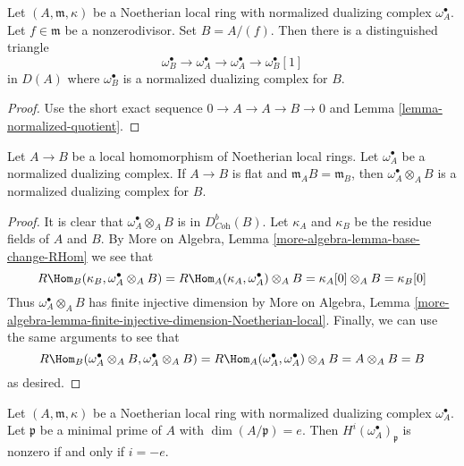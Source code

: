 \begin{lemma}
\label{lemma-divide-by-nonzerodivisor}
Let $(A, \mathfrak m, \kappa)$ be a Noetherian local
ring with normalized dualizing complex $\omega_A^\bullet$.
Let $f \in \mathfrak m$ be a
nonzerodivisor. Set $B = A/(f)$. Then there is a distinguished
triangle
$$
\omega_B^\bullet \to \omega_A^\bullet \to \omega_A^\bullet \to
\omega_B^\bullet[1]
$$
in $D(A)$ where $\omega_B^\bullet$ is a normalized dualizing complex
for $B$.
\end{lemma}

\begin{proof}
Use the short exact sequence $0 \to A \to A \to B \to 0$
and Lemma \ref{lemma-normalized-quotient}.
\end{proof}

\begin{lemma}
\label{lemma-flat-unramified}
Let $A \to B$ be a local homomorphism of Noetherian local rings.
Let $\omega_A^\bullet$ be a normalized dualizing complex.
If $A \to B$ is flat and $\mathfrak m_A B = \mathfrak m_B$,
then $\omega_A^\bullet \otimes_A B$ is a normalized dualizing
complex for $B$.
\end{lemma}

\begin{proof}
It is clear that $\omega_A^\bullet \otimes_A B$ is in $D^b_{\textit{Coh}}(B)$.
Let $\kappa_A$ and $\kappa_B$ be the residue fields of $A$ and $B$.
By More on Algebra, Lemma \ref{more-algebra-lemma-base-change-RHom}
we see that
$$
R\Hom_B(\kappa_B, \omega_A^\bullet \otimes_A B) =
R\Hom_A(\kappa_A, \omega_A^\bullet) \otimes_A B =
\kappa_A[0] \otimes_A B = \kappa_B[0]
$$
Thus $\omega_A^\bullet \otimes_A B$ has finite injective dimension by
More on Algebra, Lemma
\ref{more-algebra-lemma-finite-injective-dimension-Noetherian-local}.
Finally, we can use the same arguments to see that
$$
R\Hom_B(\omega_A^\bullet \otimes_A B, \omega_A^\bullet \otimes_A B) =
R\Hom_A(\omega_A^\bullet, \omega_A^\bullet) \otimes_A B = A \otimes_A B = B
$$
as desired.
\end{proof}

\begin{lemma}
\label{lemma-nonvanishing-generically-local}
Let $(A, \mathfrak m, \kappa)$ be a Noetherian local ring with
normalized dualizing complex $\omega_A^\bullet$.
Let $\mathfrak p$ be a minimal prime of $A$ with
$\dim(A/\mathfrak p) = e$. Then
$H^i(\omega_A^\bullet)_\mathfrak p$ is nonzero
if and only if $i = -e$.
\end{lemma}

